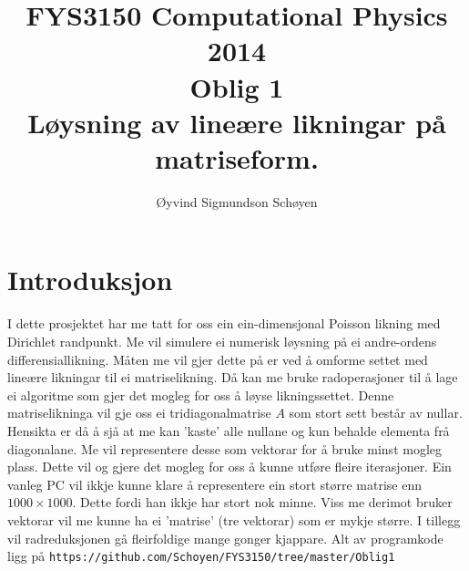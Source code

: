 \documentclass[11pt, a4paper]{article}
\begin{document}
\begin{titlepage}

  \title{\normalsize FYS3150 Computational Physics 2014\\
  \vspace{10mm}
  \huge Oblig 1\\
  \vspace{10mm}
  \normalsize {\bf Løysning av lineære likningar på matriseform.}}

  \author{Øyvind Sigmundson Schøyen}

\end{titlepage}
\maketitle

\newpage
  \tableofcontents
\newpage

\section{Introduksjon}
  I dette prosjektet har me tatt for oss ein ein-dimensjonal Poisson likning med Dirichlet randpunkt.
  Me vil simulere ei numerisk løysning på ei andre-ordens differensiallikning.
  Måten me vil gjer dette på er ved å omforme settet med lineære likningar til ei matriselikning. Då 
  kan me bruke radoperasjoner til å lage ei algoritme som gjer det mogleg for oss å løyse 
  likningssettet. Denne matriselikninga vil gje oss ei tridiagonalmatrise $A$ som stort sett består 
  av  nullar. Hensikta er då å sjå at me kan 'kaste' alle nullane og kun behalde elementa frå 
  diagonalane.
  Me vil representere desse som vektorar for å bruke minst mogleg plass. Dette vil og gjere det mogleg  for oss å kunne utføre fleire iterasjoner. Ein vanleg PC vil ikkje kunne klare å representere ein 
  stort større matrise enn $1000\times1000$. Dette fordi han ikkje har stort nok minne. Viss me 
  derimot bruker vektorar vil me kunne ha ei 'matrise' (tre vektorar) som er mykje større. I tillegg 
  vil radreduksjonen gå fleirfoldige mange gonger kjappare.
  Alt av programkode ligg på \texttt{https://github.com/Schoyen/FYS3150/tree/master/Oblig1}
\end{document}

